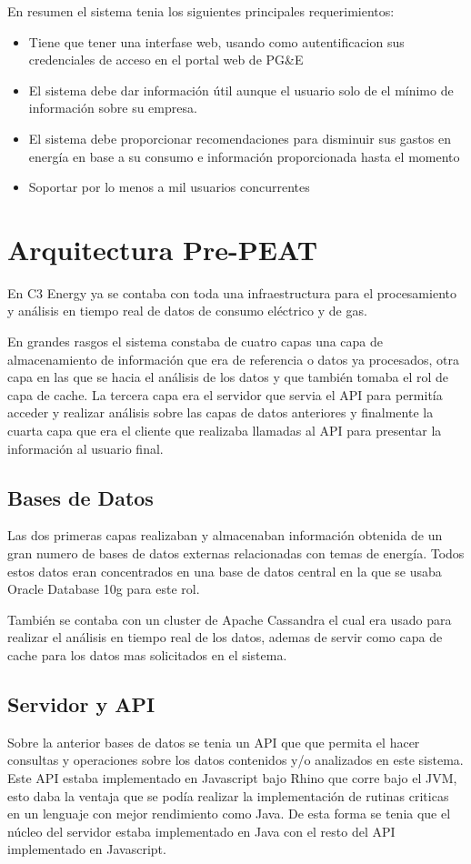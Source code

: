\documentclass{article}
\begin{document}
En resumen el sistema tenia los siguientes principales requerimientos:
\begin{itemize}
\item Tiene que tener una interfase web, usando como autentificacion
  sus credenciales de acceso en el portal web de PG\&E
\item El sistema debe dar información útil aunque el usuario solo de
  el mínimo de información sobre su empresa.
\item El sistema debe proporcionar recomendaciones para disminuir sus
  gastos en energía en base a su consumo e información proporcionada
  hasta el momento
\item Soportar por lo menos a mil usuarios concurrentes
\end{itemize}

\section{Arquitectura Pre-PEAT}
En C3 Energy ya se contaba con toda una infraestructura para el
procesamiento y análisis en tiempo real de datos de consumo eléctrico
y de gas.

En grandes rasgos el sistema constaba de cuatro capas una capa de
almacenamiento de información que era de referencia o datos ya
procesados, otra capa en las que se hacia el análisis de los datos
y que también tomaba el rol de capa de cache. La tercera capa era el
servidor que servia el API para permitía acceder y realizar análisis
sobre las capas de datos anteriores y finalmente la cuarta capa que
era el cliente que realizaba llamadas al API para presentar la
información al usuario final.

\subsection{Bases de Datos}
Las dos primeras capas realizaban y almacenaban información obtenida
de un gran numero de bases de datos externas relacionadas con temas
de energía. Todos estos datos eran concentrados en una base de datos
central en la que se usaba Oracle Database 10g para este rol.

También se contaba con un cluster de Apache Cassandra el cual era usado
para realizar el análisis en tiempo real de los datos, ademas de servir
como capa de cache para los datos mas solicitados en el sistema.

\subsection{Servidor y API}
Sobre la anterior bases de datos se tenia un API que que permita el
hacer consultas y operaciones sobre los datos contenidos y/o analizados
en este sistema. Este API estaba implementado en Javascript bajo Rhino
que corre bajo el JVM, esto daba la ventaja que se podía realizar la
implementación de rutinas criticas en un lenguaje con mejor
rendimiento como Java. De esta forma se tenia que el núcleo del
servidor estaba implementado en Java con el resto del API implementado
en Javascript.
\end{document}
